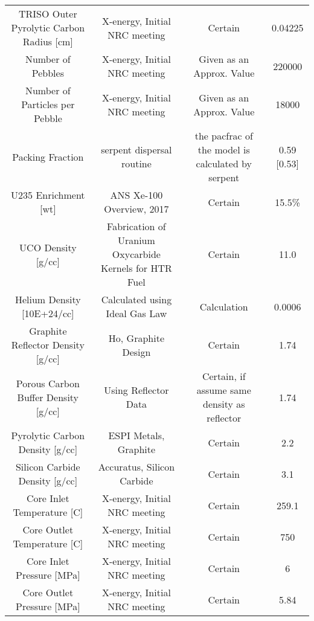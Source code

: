 \documentclass[letterpaper]{article}
\begin{document}
\begin{adjustbox}{max width=\textwidth}
\begin{tabular}{c c c c}
 TRISO Outer Pyrolytic Carbon Radius [cm] & X-energy, Initial NRC meeting & Certain & 0.04225 \\

 Number of Pebbles & X-energy, Initial NRC meeting & Given as an Approx. Value & 220000 \\

 Number of Particles per Pebble & X-energy, Initial NRC meeting & Given as an Approx. Value & 18000 \\

 Packing Fraction & serpent dispersal routine & the pacfrac of the model is calculated by serpent & 0.59 [0.53] \\

 U235 Enrichment [wt] & ANS Xe-100 Overview, 2017 & Certain & 15.5\% \\

 UCO Density [g/cc] & Fabrication of Uranium Oxycarbide Kernels for HTR Fuel & Certain & 11.0 \\

 Helium Density [10E+24/cc] & Calculated using Ideal Gas Law & Calculation &  0.0006\\

 Graphite Reflector Density [g/cc] & Ho, Graphite Design & Certain & 1.74 \\

 Porous Carbon Buffer Density [g/cc] & Using Reflector Data & Certain, if assume same density as reflector & 1.74 \\

 Pyrolytic Carbon Density [g/cc] & ESPI Metals, Graphite & Certain & 2.2 \\

 Silicon Carbide Density [g/cc] & Accuratus, Silicon Carbide & Certain & 3.1 \\

 Core Inlet Temperature [C] & X-energy, Initial NRC meeting & Certain & 259.1 \\

 Core Outlet Temperature [C] & X-energy, Initial NRC meeting & Certain & 750 \\

 Core Inlet Pressure [MPa] & X-energy, Initial NRC meeting & Certain & 6 \\

 Core Outlet Pressure [MPa] & X-energy, Initial NRC meeting & Certain & 5.84 \\




 \end{tabular}
\end{adjustbox}
\end{document}
